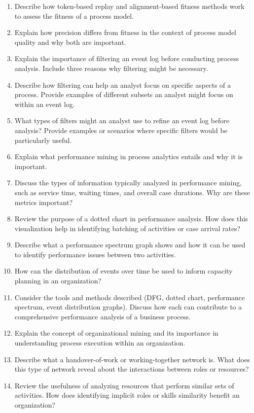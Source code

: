 \begin{enumerate}
    \item Describe how token-based replay and alignment-based fitness methods work to assess the fitness of a process model.
    \item Explain how precision differs from fitness in the context of process model quality and why both are important.
    \item Explain the importance of filtering an event log before conducting process analysis. Include three reasons why filtering might be necessary.
    \item Describe how filtering can help an analyst focus on specific aspects of a process. Provide examples of different subsets an analyst might focus on within an event log.
    \item What types of filters might an analyst use to refine an event log before analysis? Provide examples or scenarios where specific filters would be particularly useful.
    \item Explain what performance mining in process analytics entails and why it is important.
    \item Discuss the types of information typically analyzed in performance mining, such as service time, waiting times, and overall case durations. Why are these metrics important?
    \item Review the purpose of a dotted chart in performance analysis. How does this visualization help in identifying batching of activities or case arrival rates?
    \item Describe what a performance spectrum graph shows and how it can be used to identify performance issues between two activities.
    \item How can the distribution of events over time be used to inform capacity planning in an organization?
    \item Consider the tools and methods described (DFG, dotted chart, performance spectrum, event distribution graphs). Discuss how each can contribute to a comprehensive performance analysis of a business process.
    \item Explain the concept of organizational mining and its importance in understanding process execution within an organization.
    \item Describe what a handover-of-work or working-together network is. What does this type of network reveal about the interactions between roles or resources?
    \item Review the usefulness of analyzing resources that perform similar sets of activities. How does identifying implicit roles or skills similarity benefit an organization?
\end{enumerate}
